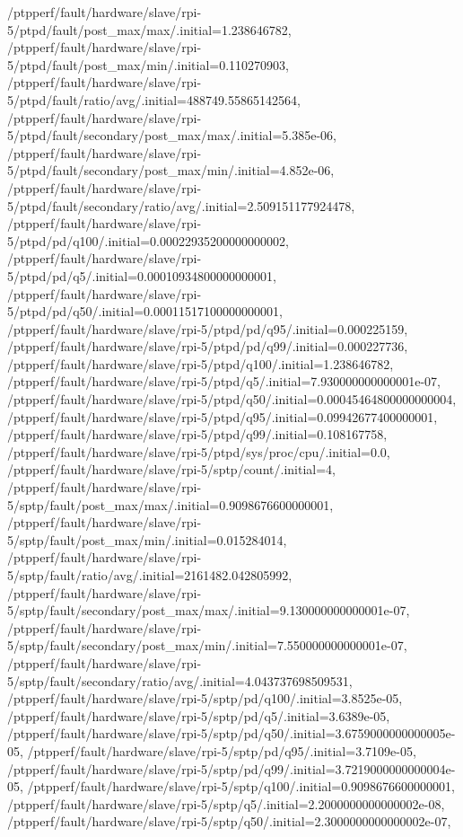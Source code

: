 {    /ptpperf/fault/hardware/slave/rpi-5/ptpd/fault/post_max/max/.initial=1.238646782,
    /ptpperf/fault/hardware/slave/rpi-5/ptpd/fault/post_max/min/.initial=0.110270903,
    /ptpperf/fault/hardware/slave/rpi-5/ptpd/fault/ratio/avg/.initial=488749.55865142564,
    /ptpperf/fault/hardware/slave/rpi-5/ptpd/fault/secondary/post_max/max/.initial=5.385e-06,
    /ptpperf/fault/hardware/slave/rpi-5/ptpd/fault/secondary/post_max/min/.initial=4.852e-06,
    /ptpperf/fault/hardware/slave/rpi-5/ptpd/fault/secondary/ratio/avg/.initial=2.509151177924478,
    /ptpperf/fault/hardware/slave/rpi-5/ptpd/pd/q100/.initial=0.00022935200000000002,
    /ptpperf/fault/hardware/slave/rpi-5/ptpd/pd/q5/.initial=0.00010934800000000001,
    /ptpperf/fault/hardware/slave/rpi-5/ptpd/pd/q50/.initial=0.00011517100000000001,
    /ptpperf/fault/hardware/slave/rpi-5/ptpd/pd/q95/.initial=0.000225159,
    /ptpperf/fault/hardware/slave/rpi-5/ptpd/pd/q99/.initial=0.000227736,
    /ptpperf/fault/hardware/slave/rpi-5/ptpd/q100/.initial=1.238646782,
    /ptpperf/fault/hardware/slave/rpi-5/ptpd/q5/.initial=7.930000000000001e-07,
    /ptpperf/fault/hardware/slave/rpi-5/ptpd/q50/.initial=0.00045464800000000004,
    /ptpperf/fault/hardware/slave/rpi-5/ptpd/q95/.initial=0.09942677400000001,
    /ptpperf/fault/hardware/slave/rpi-5/ptpd/q99/.initial=0.108167758,
    /ptpperf/fault/hardware/slave/rpi-5/ptpd/sys/proc/cpu/.initial=0.0,
    /ptpperf/fault/hardware/slave/rpi-5/sptp/count/.initial=4,
    /ptpperf/fault/hardware/slave/rpi-5/sptp/fault/post_max/max/.initial=0.9098676600000001,
    /ptpperf/fault/hardware/slave/rpi-5/sptp/fault/post_max/min/.initial=0.015284014,
    /ptpperf/fault/hardware/slave/rpi-5/sptp/fault/ratio/avg/.initial=2161482.042805992,
    /ptpperf/fault/hardware/slave/rpi-5/sptp/fault/secondary/post_max/max/.initial=9.130000000000001e-07,
    /ptpperf/fault/hardware/slave/rpi-5/sptp/fault/secondary/post_max/min/.initial=7.550000000000001e-07,
    /ptpperf/fault/hardware/slave/rpi-5/sptp/fault/secondary/ratio/avg/.initial=4.043737698509531,
    /ptpperf/fault/hardware/slave/rpi-5/sptp/pd/q100/.initial=3.8525e-05,
    /ptpperf/fault/hardware/slave/rpi-5/sptp/pd/q5/.initial=3.6389e-05,
    /ptpperf/fault/hardware/slave/rpi-5/sptp/pd/q50/.initial=3.6759000000000005e-05,
    /ptpperf/fault/hardware/slave/rpi-5/sptp/pd/q95/.initial=3.7109e-05,
    /ptpperf/fault/hardware/slave/rpi-5/sptp/pd/q99/.initial=3.7219000000000004e-05,
    /ptpperf/fault/hardware/slave/rpi-5/sptp/q100/.initial=0.9098676600000001,
    /ptpperf/fault/hardware/slave/rpi-5/sptp/q5/.initial=2.2000000000000002e-08,
    /ptpperf/fault/hardware/slave/rpi-5/sptp/q50/.initial=2.3000000000000002e-07,
}
